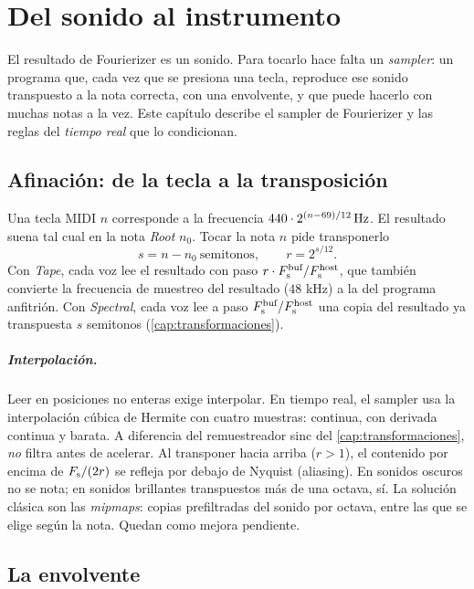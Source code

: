 \chapter{Del sonido al instrumento}\label{cap:instrumento}

El resultado de Fourierizer es un sonido. Para tocarlo hace falta un \emph{sampler}: un programa que,
cada vez que se presiona una tecla, reproduce ese sonido transpuesto a la nota correcta, con una
envolvente, y que puede hacerlo con muchas notas a la vez. Este capítulo describe el sampler de
Fourierizer y las reglas del \emph{tiempo real} que lo condicionan.

\section{Afinación: de la tecla a la transposición}

Una tecla MIDI $n$ corresponde a la frecuencia $440\cdot2^{(n-69)/12}\,\mathrm{Hz}$. El resultado suena tal
cual en la nota \emph{Root} $n_0$. Tocar la nota $n$ pide transponerlo
\[
  s=n-n_0\ \text{semitonos},\qquad r=2^{s/12}.
\]
Con \emph{Tape}, cada voz lee el resultado con paso $r\cdot F_{\mathrm{s}}^{\text{buf}}/F_{\mathrm{s}}^{\text{host}}$, que
también convierte la frecuencia de muestreo del resultado ($48$ kHz) a la del programa anfitrión.
Con \emph{Spectral}, cada voz lee a paso $F_{\mathrm{s}}^{\text{buf}}/F_{\mathrm{s}}^{\text{host}}$ una copia del resultado
ya transpuesta $s$ semitonos (\cref{cap:transformaciones}).

\paragraph{Interpolación.} Leer en posiciones no enteras exige interpolar. En tiempo real, el
sampler usa la interpolación cúbica de Hermite con cuatro muestras: continua, con derivada
continua y barata. A diferencia del remuestreador sinc del \cref{cap:transformaciones}, \emph{no}
filtra antes de acelerar. Al transponer hacia arriba ($r>1$), el contenido por encima de
$F_{\mathrm{s}}/(2r)$ se refleja por debajo de Nyquist (aliasing). En sonidos oscuros no se nota; en sonidos
brillantes transpuestos más de una octava, sí. La solución clásica son las \emph{mipmaps}: copias
prefiltradas del sonido por octava, entre las que se elige según la nota. Quedan como mejora
pendiente.

\section{La envolvente}

